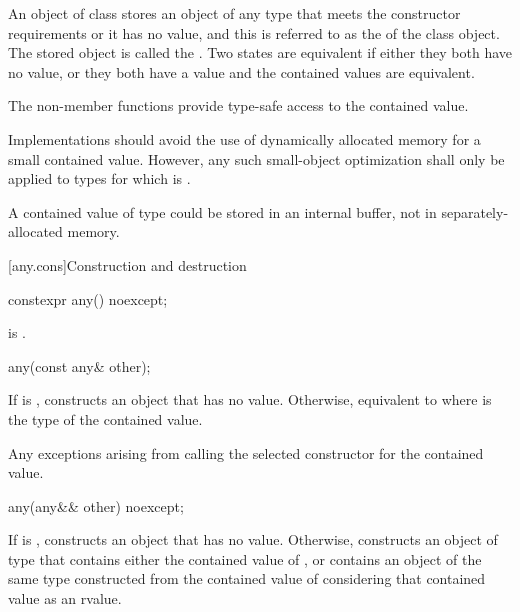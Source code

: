 \pnum
An object of class  stores an object of any type that meets the constructor requirements or it has no value,
and this is referred to as the  of the class  object.
The stored object is called the .
Two states are equivalent if either they both have no value, or they both have a value and the contained values are equivalent.

\pnum
The non-member  functions provide type-safe access to the contained value.

\pnum
Implementations should avoid the use of dynamically allocated memory for a small contained value.
However, any such small-object optimization shall only be applied to types  for which
 is .
\begin{example}
A contained value of type  could be stored in an internal buffer,
not in separately-allocated memory.
\end{example}

[any.cons]{Construction and destruction}

%
\begin{itemdecl}
constexpr any() noexcept;
\end{itemdecl}

\begin{itemdescr}
\pnum
\ensures
{} is .
\end{itemdescr}

%
\begin{itemdecl}
any(const any& other);
\end{itemdecl}

\begin{itemdescr}
\pnum
\effects
If  is , constructs an object that has no value.
Otherwise, equivalent to 
where  is the type of the contained value.

\pnum
\throws
Any exceptions arising from calling the selected constructor for the contained value.
\end{itemdescr}

%
\begin{itemdecl}
any(any&& other) noexcept;
\end{itemdecl}

\begin{itemdescr}
\pnum
\effects
If  is , constructs an object that has no value.
Otherwise, constructs an object of type  that
contains either the contained value of , or
contains an object of the same type constructed from
the contained value of  considering that contained value as an rvalue.
\end{itemdescr}

